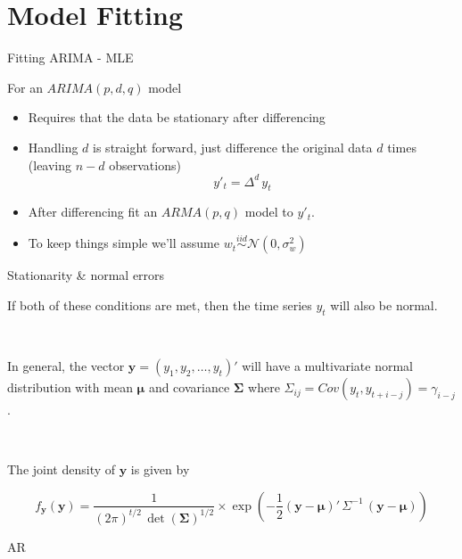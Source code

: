 \documentclass[11pt,ignorenonframetext,]{beamer}
\begin{document}
\section{Model Fitting}\label{model-fitting}

\begin{frame}[t]{Fitting ARIMA - MLE}

For an \(ARIMA(p,d,q)\) model

\begin{itemize}
\item
  Requires that the data be stationary after differencing \vspace{3mm}
\item
  Handling \(d\) is straight forward, just difference the original data
  \(d\) times (leaving \(n-d\) observations)
  \[ y'_t = \Delta^d \, y_t \] \vspace{3mm}
\item
  After differencing fit an \(ARMA(p,q)\) model to \(y'_t\).
  \vspace{3mm}
\item
  To keep things simple we'll assume
  \(w_t \overset{iid}{\sim} \mathcal{N}(0,\sigma^2_w)\)
\end{itemize}

\end{frame}

\begin{frame}{Stationarity \& normal errors}

If both of these conditions are met, then the time series \(y_t\) will
also be normal.

\(~\)

In general, the vector \(\bm{y} = (y_1, y_2, \ldots, y_t)'\) will have a
multivariate normal distribution with mean \(\bm\mu\) and covariance
\(\bm\Sigma\) where
\(\Sigma_{ij} = Cov(y_t, y_{t+i-j}) = \gamma_{i-j}\).

\(~\)

The joint density of \(\bm y\) is given by

\[ f_{\bm y}(\bm y) = \frac{1}{(2\pi)^{t/2}\,\det(\bm\Sigma)^{1/2}} \times \exp\left( -\frac{1}{2}(\bm y - \bm \mu)' \, \Sigma^{-1} \, (\bm y - \bm \mu) \right) \]

\end{frame}

\begin{frame}{AR}

\end{frame}
\end{document}
